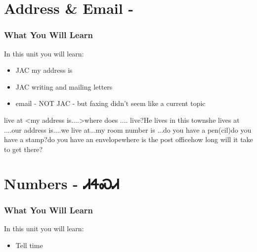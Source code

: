 \begin{multicols}
\chapter{Address \& Email - }
\subsection{What You Will Learn}
In this unit you will learn:
\begin{itemize}
\item JAC my address is
\item JAC writing and mailing letters
\item email - NOT JAC - but faxing didn't seem like a current topic
\end{itemize}\newpage

\newpageI live at <my address is....>where does .... live?He lives in this townshe lives at ....our address is....we live at...my room number is ...do you have a pen(cil)do you have a stamp?do you have an envelopewhere is the post officehow long will it take to get there?
\chapter{Numbers - ᏗᏎᏍᏗ}
\subsection{What You Will Learn}
In this unit you will learn:
\begin{itemize}
\item Tell time
\end{itemize}\newpage


\end{multicols}
